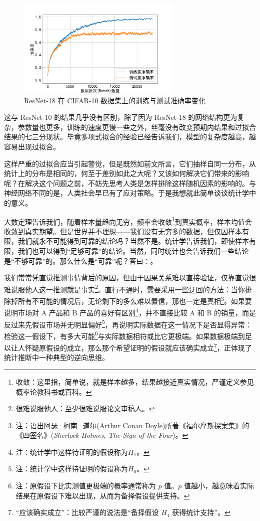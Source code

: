 \begin{figure}[H]
    \centering
    \includegraphics[width=0.7\textwidth]{img/resnet18_cifar10.png}
    \caption{ResNet-18 在 CIFAR-10 数据集上的训练与测试准确率变化}
    \label{fig:resnet18-cifar10-accuracy}
\end{figure}

这与 ResNet-10 的结果几乎没有区别，除了因为 ResNet-18 的网络结构更为复杂，参数量也更多，训练的速度更慢一些之外，丝毫没有改变预期内结果和过拟合结果的七三分现状。毕竟多项式拟合的经验已经告诉我们，模型的复杂度越高，越容易出现过拟合。

这样严重的过拟合应当引起警觉，但是既然如前文所言，它们抽样自同一分布，从统计上的分布是相同的，何至于差别如此之大呢？又该如何解决它们带来的影响呢？在解决这个问题之前，不妨先思考人类是怎样排除这样随机因素的影响的。与神经网络不同的是，人类社会早已有了应对策略。于是我想就此简单谈谈统计学中的意义。

大数定理告诉我们，随着样本量趋向无穷，频率会收敛\footnote{收敛：这里指，简单说，就是样本越多，结果越接近真实情况，严谨定义参见概率论教科书或百科。}到真实概率，样本均值会收敛到真实期望。但是世界并不理想——我们没有无穷多的数据，但仅因样本有限，我们就永不可能得到可靠的结论吗？当然不是。统计学告诉我们，即使样本有限，我们也可以得到“足够可靠”的结论。当然，同时统计也会告诉我们一些结论是“不够可靠”的。那么什么是“可靠”呢？答曰：。

我们常常凭直觉推测事情背后的原因，但由于因果关系难以直接验证，仅靠直觉很难说服他人这一推测就是事实\footnote{很难说服他人：至少很难说服论文审稿人。}。直行不通时，需要采用一些迂回的方法：当你排除掉所有不可能的情况后，无论剩下的多么难以置信，那也一定是真相\footnote{注：语出阿瑟·柯南·道尔(Arthur Conan Doyle)所著《福尔摩斯探案集》的《四签名》(\emph{Sherlock Holmes, The Sign of the Four})。}。如果要说明市场对 A 产品和 B 产品的喜好有区别\footnote{注：统计学中这样待证明的假设称为$H_1$。}，并不直接比较 A 和 B 的销量，而是反过来先假设市场并无明显偏好\footnote{注：统计学中这样待证明的假设称为$H_0$。}，再说明实际数据在这一情况下是否显得异常：检验这一假设下，有多大可能\footnote{注：原假设下比实测值更极端的概率通常称为 $p$ 值。$p$ 值越小，越意味着实际结果在原假设下难以出现，从而为备择假设提供支持。}与实际数据相符或比它更极端。如果数据极端到足以让人怀疑原假设的成立，那么那个希望证明的假设就应该确实成立\footnote{“应该确实成立”：比较严谨的说法是“备择假设 $H_1$ 获得统计支持”。}，正体现了统计推断中一种典型的逆向思维。

